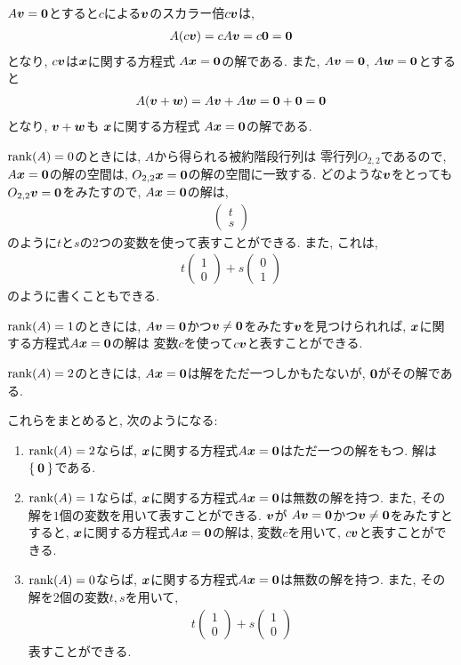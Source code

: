$A\boldsymbol{v}=\boldsymbol{0}$とすると$c$による$\boldsymbol{v}$のスカラー倍$c\boldsymbol{v}$は,
\begin{align*}
A(c\boldsymbol{v})=cA\boldsymbol{v}=c\boldsymbol{0}=\boldsymbol{0}
\end{align*}
となり,
$c\boldsymbol{v}$は$\boldsymbol{x}$に関する方程式
$A\boldsymbol{x}=\boldsymbol{0}$の解である.
また,
$A\boldsymbol{v}=\boldsymbol{0}$, $A\boldsymbol{w}=\boldsymbol{0}$とすると
\begin{align*}
A(\boldsymbol{v}+\boldsymbol{w})=A\boldsymbol{v}+A\boldsymbol{w}=\boldsymbol{0}+\boldsymbol{0}=\boldsymbol{0}
\end{align*}
となり,
$\boldsymbol{v}+\boldsymbol{w}$も
$\boldsymbol{x}$に関する方程式
$A\boldsymbol{x}=\boldsymbol{0}$の解である.

$\operatorname{rank}(A)=0$のときには, $A$から得られる被約階段行列は
零行列$O_{2,2}$であるので,
$A\boldsymbol{x}=\boldsymbol{0}$の解の空間は, $O_{2,2}\boldsymbol{x}=\boldsymbol{0}$の解の空間に一致する.
どのような$\boldsymbol{v}$をとっても
$O_{2,2}\boldsymbol{v}=\boldsymbol{0}$をみたすので,
$A\boldsymbol{x}=\boldsymbol{0}$の解は,
\begin{align*}
  \begin{pmatrix}
    t\\s
    \end{pmatrix} 
\end{align*}
のように$t$と$s$の2つの変数を使って表すことができる.
また, これは, 
\begin{align*}
  t
  \begin{pmatrix}
    1\\0
    \end{pmatrix} 
  +
    s
  \begin{pmatrix}
    0\\1
    \end{pmatrix} 
\end{align*}
のように書くこともできる.

$\operatorname{rank}(A)=1$のときには,
$A\boldsymbol{v}=\boldsymbol{0}$かつ$\boldsymbol{v}\neq \boldsymbol{0}$をみたす$\boldsymbol{v}$を見つけられれば,
$\boldsymbol{x}$に関する方程式$A\boldsymbol{x}=\boldsymbol{0}$の解は
変数$c$を使って$c\boldsymbol{v}$と表すことができる.

$\operatorname{rank}(A)=2$のときには,
$A\boldsymbol{x}=\boldsymbol{0}$は解をただ一つしかもたないが,
$\boldsymbol{0}$がその解である.

これらをまとめると,
次のようになる:
\begin{enumerate}
  \item $\operatorname{rank}(A)=2$ならば,
    $\boldsymbol{x}$に関する方程式$A\boldsymbol{x}=\boldsymbol{0}$はただ一つの解をもつ.
    解は$\Set{\boldsymbol{0}}$である.
  \item $\operatorname{rank}(A)=1$ならば,
    $\boldsymbol{x}$に関する方程式$A\boldsymbol{x}=\boldsymbol{0}$は無数の解を持つ.
    また, その解を$1$個の変数を用いて表すことができる.
    $\boldsymbol{v}$が
    $A\boldsymbol{v}=\boldsymbol{0}$かつ$\boldsymbol{v}\neq \boldsymbol{0}$をみたすとすると,
    $\boldsymbol{x}$に関する方程式$A\boldsymbol{x}=\boldsymbol{0}$の解は,
    変数$c$を用いて, $c\boldsymbol{v}$と表すことができる.
  \item $\operatorname{rank}(A)=0$ならば,
    $\boldsymbol{x}$に関する方程式$A\boldsymbol{x}=\boldsymbol{0}$は無数の解を持つ.
    また, その解を$2$個の変数$t,s$を用いて,
    \begin{align*}
      t
      \begin{pmatrix}
        1\\0
      \end{pmatrix}
      +s
      \begin{pmatrix}
        1\\0
      \end{pmatrix}
    \end{align*}
    表すことができる.
\end{enumerate}

